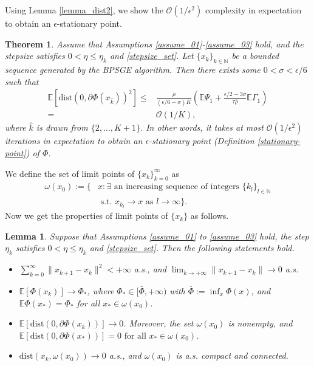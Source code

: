 \documentclass[letterpaper]{article} %
\newtheorem{theorem}{Theorem}
\newtheorem{lemma}{Lemma}
\begin{document}
	Using Lemma \ref{lemma_dist2}, we show the $\mathcal{O}(1/\epsilon^{2})$ complexity  in expectation  to obtain an $\epsilon$-stationary point.
	\begin{theorem}\label{subgradient_rate}
		Assume that Assumptions \ref{assume_01}-\ref{assume_03} hold, and the stepsize satisfies $0<\eta\le\eta_{k}$ and \eqref{stepsize_set}.  Let $\{x_{k}\}_{k\in\mathbb{N}}$ be a bounded sequence generated by the BPSGE algorithm. Then there exists  some $0<\sigma<\epsilon/6$ such that
		\begin{align*}
			\mathbb{E}[\mathrm{dist}(0,\partial\Phi(x_{\hat{k}}))^{2}]\le& \frac{\bar{\rho}}{(\epsilon/6-\sigma)K}(\mathbb{E}\Psi_{1}+\frac{\epsilon/2-3\sigma}{\tau\bar{\rho}}\mathbb{E}\Gamma_{1})\\
			=&\mathcal{O}(1/K),
		\end{align*}
		where $\hat{k}$ is drawn from $\{2, \dots, K+1\}$. In other words, it takes at most $\mathcal{O}(1/\epsilon^{2})$ iterations  in expectation  to obtain an $\epsilon$-stationary point (Definition \ref{stationary-point}) of $\Phi$.
	\end{theorem}

	We define the set of limit points of $\{x_{k}\}_{k=0}^{\infty}$ as
	\begin{align*}
		\omega(x_{0}):=\{&x: \exists \text{ an increasing sequence of integers } \{k_{l}\}_{l\in\mathbb{N}}\\
		&\text{ s.t. } x_{k_{l}}\rightarrow x\text{ as } l\rightarrow \infty\}.
	\end{align*}
	Now we get the properties of limit points of $\{x_{k}\}$ as follows.
	\begin{lemma}\label{statements_lemma}
		Suppose that Assumptions \ref{assume_01} to \ref{assume_03} hold,   the step $\eta_{k}$ satisfies $0<\eta\le \eta_{k}$ and \eqref{stepsize_set}.  Then the following statements hold.
		\begin{itemize}
			\item $\sum_{k=0}^{\infty}\|x_{k+1}-x_{k}\|^{2}<+\infty$ a.s., and $\lim_{k\rightarrow+\infty}\|x_{k+1}-x_{k}\|\rightarrow0$ a.s.
			\item $\mathbb{E}[\Phi(x_{k})]\rightarrow\Phi_{*}$, where $\Phi_{*}\in[\bar{\Phi},+\infty)$  with $\bar{\Phi}:=\inf_{x} \Phi(x)$, and $\mathbb{E}\Phi(x_{*})=\Phi_{*}$ for all $x_{*}\in\omega(x_{0})$.
			\item $\mathbb{E}[\text{dist}(0,\partial\Phi(x_{k}))]\rightarrow0$. Moreover, the set $\omega(x_{0})$ is nonempty, and $\mathbb{E}[\text{dist}(0,\partial\Phi(x_{*}))]=0 \text{ for all } x_{*}\in\omega(x_{0})$.
			\item $\text{dist}(x_{k},\omega(x_{0}))\rightarrow0$ a.s., and $\omega(x_{0})$ is a.s. compact and connected.
		\end{itemize}
	\end{lemma}
\end{document}
